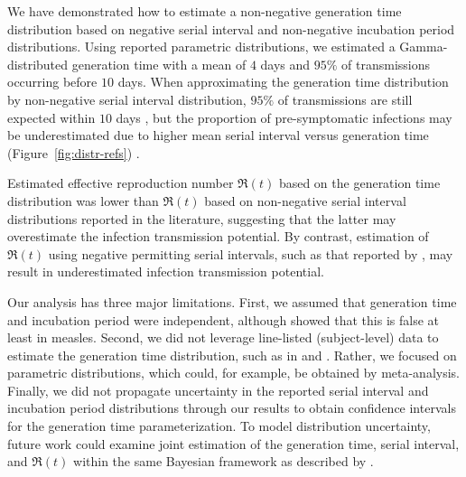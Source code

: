 We have demonstrated how to estimate
a non-negative generation time distribution
based on negative serial interval
and non-negative incubation period distributions.
Using reported parametric \covid distributions,
we estimated a Gamma-distributed generation time
with a mean of $4$ days and
$95\%$ of transmissions occurring before $10$ days.
When approximating the generation time distribution
by non-negative serial interval distribution,
$95\%$ of transmissions are still expected within $10$ days
\cite{Zhang2020,Nishiura2020},
but the proportion of pre-symptomatic infections may be underestimated
due to higher mean serial interval versus generation time
(Figure~\ref{fig:distr-refs}) \cite{Ganyani2020,Tindale2020}.
\par
Estimated effective reproduction number $\Re(t)$
based on the generation time distribution
was lower than $\Re(t)$ based on
non-negative serial interval distributions reported in the literature,
suggesting that the latter may overestimate
the infection transmission potential.
By contrast, estimation of $\Re(t)$ using
negative permitting serial intervals,
such as that reported by \textcite{Du2020},
may result in underestimated infection transmission potential.
\par
Our analysis has three major limitations.
First, we assumed that
generation time and incubation period were independent,
although \textcite{Klinkenberg2011} showed that
this is false at least in measles.
Second, we did not leverage line-listed (subject-level) data
to estimate the generation time distribution,
such as in \cite{Ganyani2020} and \cite{Klinkenberg2011}.
Rather, we focused on parametric distributions,
which could, for example, be obtained by meta-analysis.
Finally, we did not propagate uncertainty in the reported
serial interval and incubation period distributions
through our results to obtain confidence intervals for
the generation time parameterization.
To model distribution uncertainty,
future work could examine joint estimation of
the generation time, serial interval, and $\Re(t)$ within
the same Bayesian framework as described by \cite{Cori2013}.
